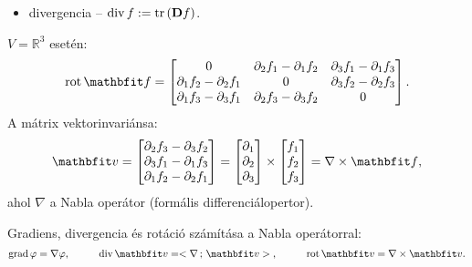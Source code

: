 \documentclass[lang=magyar]{math-handout}
\begin{document}
\begin{note}
\begin{itemize}
    \item divergencia
          \tabto{2.4cm} – \tabto{3cm}
          $\operatorname{div} f := \operatorname{tr} \left( \mathbf{D} f \right)$.
  \end{itemize}
  $V = \mathbb{R}^3$ esetén:
  \[
    \rot \rvec f
    =
    \begin{bmatrix}
      0                               &
      \partial_2 f_1 - \partial_1 f_2 &
      \partial_3 f_1 - \partial_1 f_3
      \\
      \partial_1 f_2 - \partial_2 f_1 &
      0                               &
      \partial_3 f_2 - \partial_2 f_3
      \\
      \partial_1 f_3 - \partial_3 f_1 &
      \partial_2 f_3 - \partial_3 f_2 &
      0
    \end{bmatrix}
    \text.
  \]
  A mátrix vektorinvariánsa:
  \[
    \rvec{v}
    =
    \begin{bmatrix}
      \partial_2 f_3 - \partial_3 f_2 \\
      \partial_3 f_1 - \partial_1 f_3 \\
      \partial_1 f_2 - \partial_2 f_1
    \end{bmatrix}
    =
    \begin{bmatrix}
      \partial_1 \\ \partial_2 \\ \partial_3
    \end{bmatrix}
    \times
    \begin{bmatrix}
      f_1 \\ f_2 \\ f_3
    \end{bmatrix}
    =
    \nabla \times \rvec f
    \text,
  \]
  ahol $\nabla$ a Nabla operátor (formális differenciálopertor).
\end{note}

\begin{note}
  Gradiens, divergencia és rotáció számítása a Nabla operátorral:
  \[
    \grad \varphi = \nabla \varphi
    \text,\hspace{1cm}
    \Div \rvec v = \scalar{\nabla}{\rvec v}
    \text,\hspace{1cm}
    \rot \rvec v = \nabla \times \rvec v
    \text.
  \]
\end{note}

\end{document}
